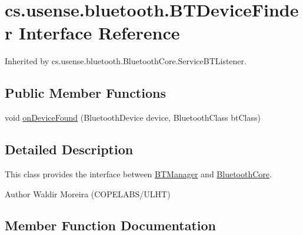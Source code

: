\hypertarget{interfacecs_1_1usense_1_1bluetooth_1_1_b_t_device_finder}{}\section{cs.\+usense.\+bluetooth.\+B\+T\+Device\+Finder Interface Reference}
\label{interfacecs_1_1usense_1_1bluetooth_1_1_b_t_device_finder}


Inherited by cs.\+usense.\+bluetooth.\+Bluetooth\+Core.\+Service\+B\+T\+Listener.

\subsection*{Public Member Functions}
\begin{DoxyCompactItemize}
\item 
void \hyperlink{interfacecs_1_1usense_1_1bluetooth_1_1_b_t_device_finder_a1e7ddf441afd41b56766911226191d07}{on\+Device\+Found} (Bluetooth\+Device device, Bluetooth\+Class bt\+Class)
\end{DoxyCompactItemize}


\subsection{Detailed Description}
This class provides the interface between \hyperlink{classcs_1_1usense_1_1bluetooth_1_1_b_t_manager}{B\+T\+Manager} and \hyperlink{classcs_1_1usense_1_1bluetooth_1_1_bluetooth_core}{Bluetooth\+Core}. \begin{DoxyAuthor}{Author}
Waldir Moreira (C\+O\+P\+E\+L\+A\+B\+S/\+U\+L\+H\+T) 
\end{DoxyAuthor}


\subsection{Member Function Documentation}
\hypertarget{interfacecs_1_1usense_1_1bluetooth_1_1_b_t_device_finder_a1e7ddf441afd41b56766911226191d07}{}
